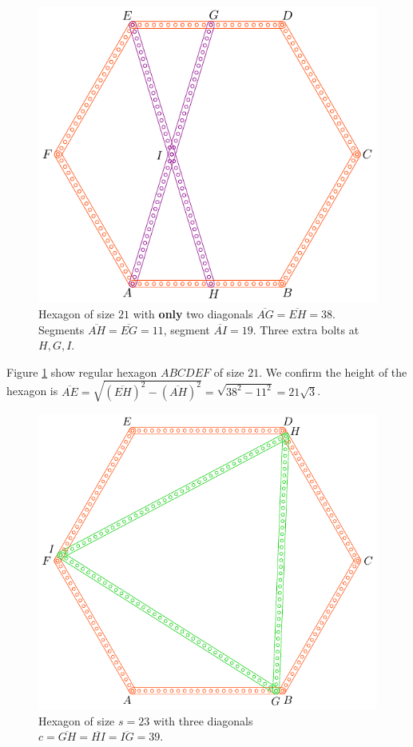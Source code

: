 \documentclass[11pt]{article}
\begin{document}
\begin{figure}[H]
\centering
\includegraphics[scale=1]{21/hexa-21a}
\caption{Hexagon of size $21$ with \textbf{only} two diagonals $\overline{AG} = \overline{EH} = 38$. Segments $\overline{AH} = \overline{EG} = 11$, segment $\overline{AI} = 19$. Three extra bolts at $H,G,I$.}
\label{fig:21a}
\end{figure}

Figure \ref{fig:21a} show regular hexagon $ABCDEF$ of size $21$. We confirm the height of the hexagon is $\overline{AE} = \sqrt{(\overline{EH})^2 - (\overline{AH})^2} = \sqrt{38^2 - 11^2} = 21\sqrt3$.

\begin{figure}[H]
\centering
\includegraphics[scale=0.9]{23/hexa-23a}
\caption{Hexagon of size $s = 23$ with three diagonals $c = \overline{GH} = \overline{HI} = \overline{IG} = 39$.}
\label{fig:23a}
\end{figure}
\end{document}
